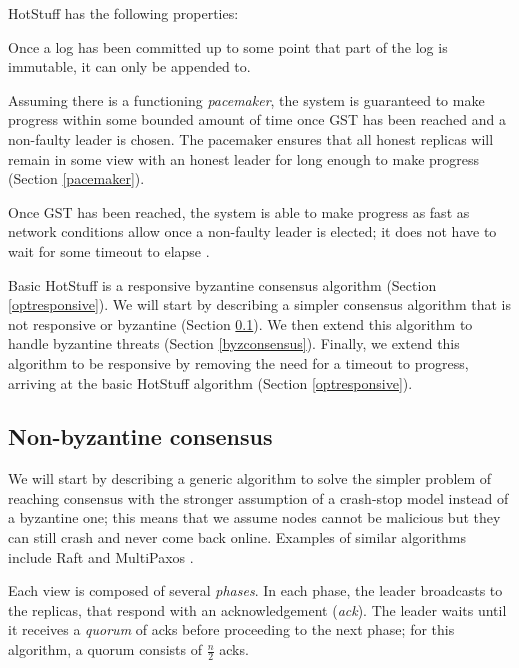 HotStuff has the following properties:

\begin{property}[Safety] \label{safetyproperty}
	Once a log has been committed up to some point that part of the log is immutable, it can only be appended to.
\end{property}

\begin{property}[Liveness] \label{livenessproperty}
	Assuming there is a functioning \textit{pacemaker}, the system is guaranteed to make progress within some bounded amount of time once GST has been reached and a non-faulty leader is chosen. The pacemaker ensures that all honest replicas will remain in some view with an honest leader for long enough to make progress (Section \ref{pacemaker}).
\end{property}

\begin{property} \label{optresponsiveproperty}
	Once GST has been reached, the system is able to make progress as fast as network conditions allow once a non-faulty leader is elected; it does not have to wait for some timeout to elapse \cite{passThunderellaBlockchainsOptimistic2018}.
\end{property}

Basic HotStuff is a responsive byzantine consensus algorithm (Section \ref{optresponsive}). We will start by describing a simpler consensus algorithm that is not responsive or byzantine (Section \ref{nonbyzconsensus}). We then extend this algorithm to handle byzantine threats (Section \ref{byzconsensus}). Finally, we extend this algorithm to be responsive by removing the need for a timeout to progress, arriving at the basic HotStuff algorithm (Section \ref{optresponsive}).

\subsection{Non-byzantine consensus} \label{nonbyzconsensus}
We will start by describing a generic algorithm to solve the simpler problem of reaching consensus with the stronger assumption of a crash-stop model instead of a byzantine one; this means that we assume nodes cannot be malicious but they can still crash and never come back online. Examples of similar algorithms include Raft \cite{ongaroSearchUnderstandableConsensus2014} and MultiPaxos \cite{lamportParttimeParliament1998, lamportPaxosMadeSimple2001}.

Each view is composed of several \textit{phases}. In each phase, the leader broadcasts to the replicas, that respond with an acknowledgement (\textit{ack}). The leader waits until it receives a \textit{quorum} of acks before proceeding to the next phase; for this algorithm, a quorum consists of $\frac{n}{2}$ acks.

